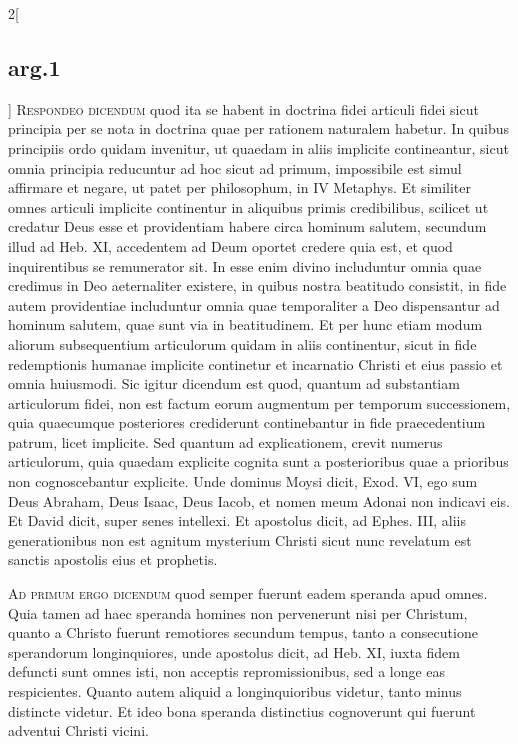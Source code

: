 \documentclass[paper=a4paper,fontsize=10pt,jafontsize=9pt,titlepage]{jlreq}
\begin{document}
\begin{paracol}{2}[\subsection{arg.1}]
{\scshape Respondeo dicendum} quod ita se habent in
doctrina fidei articuli fidei sicut principia per se nota in doctrina
quae per rationem naturalem habetur. In quibus principiis ordo quidam
invenitur, ut quaedam in aliis implicite contineantur, sicut omnia
principia reducuntur ad hoc sicut ad primum, impossibile est simul
affirmare et negare, ut patet per philosophum, in IV Metaphys. Et
similiter omnes articuli implicite continentur in aliquibus primis
credibilibus, scilicet ut credatur Deus esse et providentiam habere
circa hominum salutem, secundum illud ad Heb. XI, accedentem ad Deum
oportet credere quia est, et quod inquirentibus se remunerator sit. In
esse enim divino includuntur omnia quae credimus in Deo aeternaliter
existere, in quibus nostra beatitudo consistit, in fide autem
providentiae includuntur omnia quae temporaliter a Deo dispensantur ad
hominum salutem, quae sunt via in beatitudinem. Et per hunc etiam modum
aliorum subsequentium articulorum quidam in aliis continentur, sicut in
fide redemptionis humanae implicite continetur et incarnatio Christi et
eius passio et omnia huiusmodi. Sic igitur dicendum est quod, quantum ad
substantiam articulorum fidei, non est factum eorum augmentum per
temporum successionem, quia quaecumque posteriores crediderunt
continebantur in fide praecedentium patrum, licet implicite. Sed quantum
ad explicationem, crevit numerus articulorum, quia quaedam explicite
cognita sunt a posterioribus quae a prioribus non cognoscebantur
explicite. Unde dominus Moysi dicit, Exod. VI, ego sum Deus Abraham,
Deus Isaac, Deus Iacob, et nomen meum Adonai non indicavi eis. Et David
dicit, super senes intellexi. Et apostolus dicit, ad Ephes. III, aliis
generationibus non est agnitum mysterium Christi sicut nunc revelatum
est sanctis apostolis eius et prophetis.

\switchcolumn



\switchcolumn*[\subsection{ad.1}]

{\scshape Ad primum ergo dicendum} quod semper
fuerunt eadem speranda apud omnes. Quia tamen ad haec speranda homines
non pervenerunt nisi per Christum, quanto a Christo fuerunt remotiores
secundum tempus, tanto a consecutione sperandorum longinquiores, unde
apostolus dicit, ad Heb. XI, iuxta fidem defuncti sunt omnes isti, non
acceptis repromissionibus, sed a longe eas respicientes. Quanto autem
aliquid a longinquioribus videtur, tanto minus distincte videtur. Et
ideo bona speranda distinctius cognoverunt qui fuerunt adventui Christi
vicini.


\end{paracol}
\end{document}

